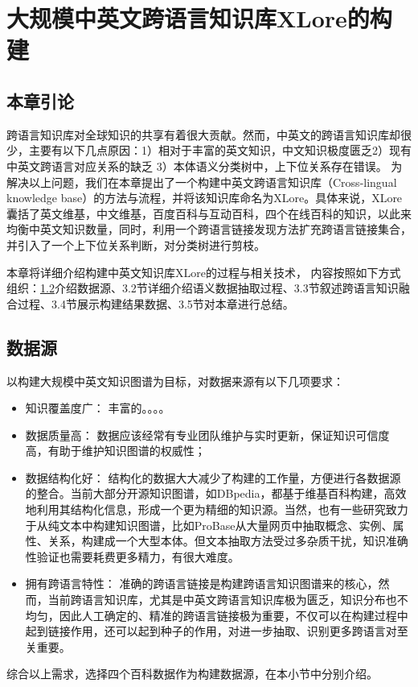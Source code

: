 \chapter{大规模中英文跨语言知识库XLore的构建}
\label{cha:cross-lingual-knowlege-base}

\section{本章引论}

跨语言知识库对全球知识的共享有着很大贡献。然而，中英文的跨语言知识库却很少，主要有以下几点原因：1）相对于丰富的英文知识，中文知识极度匮乏2）现有中英文跨语言对应关系的缺乏 3）本体语义分类树中，上下位关系存在错误。 为解决以上问题，我们在本章提出了一个构建中英文跨语言知识库（Cross-lingual knowledge base）的方法与流程，并将该知识库命名为XLore。具体来说，XLore囊括了英文维基，中文维基，百度百科与互动百科，四个在线百科的知识，以此来均衡中英文知识数量，同时，利用一个跨语言链接发现方法扩充跨语言链接集合，并引入了一个上下位关系判断，对分类树进行剪枝。

本章将详细介绍构建中英文知识库XLore的过程与相关技术， 内容按照如下方式组织：\ref{sec3:datasource}介绍数据源、3.2节详细介绍语义数据抽取过程、3.3节叙述跨语言知识融合过程、3.4节展示构建结果数据、3.5节对本章进行总结。


\section{数据源}
\label{sec3:datasource}

以构建大规模中英文知识图谱为目标，对数据来源有以下几项要求：

\begin{itemize}
\item  {\heiti 知识覆盖度广：} 丰富的。。。。
\item  {\heiti 数据质量高：} 数据应该经常有专业团队维护与实时更新，保证知识可信度高，有助于维护知识图谱的权威性；
\item  {\heiti 数据结构化好：} 结构化的数据大大减少了构建的工作量，方便进行各数据源的整合。当前大部分开源知识图谱，如DBpedia，都基于维基百科构建，高效地利用其结构化信息，形成一个更为精细的知识源。当然，也有一些研究致力于从纯文本中构建知识图谱，比如ProBase从大量网页中抽取概念、实例、属性、关系，构建成一个大型本体。但文本抽取方法受过多杂质干扰，知识准确性验证也需要耗费更多精力，有很大难度。
\item  {\heiti 拥有跨语言特性：} 准确的跨语言链接是构建跨语言知识图谱来的核心，然而，当前跨语言知识库，尤其是中英文跨语言知识库极为匮乏，知识分布也不均匀，因此人工确定的、精准的跨语言链接极为重要，不仅可以在构建过程中起到链接作用，还可以起到种子的作用，对进一步抽取、识别更多跨语言对至关重要。
\end{itemize}
综合以上需求，选择四个百科数据作为构建数据源，在本小节中分别介绍。

